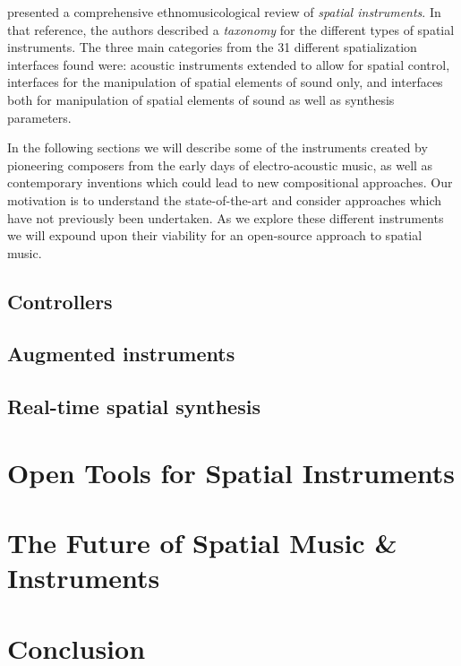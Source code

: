 \cite{pysiewicz2017instruments} presented a comprehensive ethnomusicological review of \textit{spatial instruments}. In that reference, the authors described a \textit{taxonomy} for the different types of spatial instruments. The three main categories from the 31 different spatialization interfaces found were: acoustic instruments extended to allow for spatial control, interfaces for the manipulation of spatial elements of sound only, and interfaces both for manipulation of spatial elements of sound as well as synthesis parameters. 

In the following sections we will describe some of the instruments created by pioneering composers from the early days of electro-acoustic music, as well as contemporary inventions which could lead to new compositional approaches. Our motivation is to understand the state-of-the-art and consider approaches which have not previously been undertaken. As we explore these different instruments we will expound upon their viability for an open-source approach to spatial music. 

\subsection{Controllers}
\subsection{Augmented instruments}
\subsection{Real-time spatial synthesis}
\section{Open Tools for Spatial Instruments}
\section{The Future of Spatial Music \& Instruments}

\section{Conclusion}



